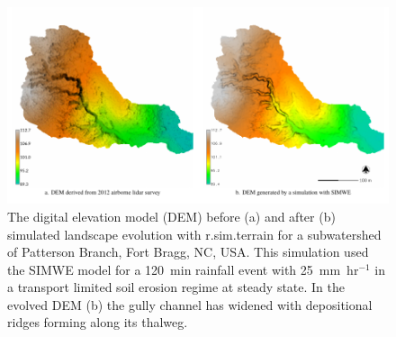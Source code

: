 \documentclass[gmd, manuscript]{copernicus}
\begin{document}


\begin{figure}%
\center
\includegraphics[width=\textwidth,height=0.925\textheight,keepaspectratio]{figures/evolution.pdf}
\caption{
The digital elevation model (DEM) 
before (a) and after (b)
simulated landscape evolution with r.sim.terrain 
for a subwatershed of Patterson Branch, Fort Bragg, NC, USA. 
This simulation used the SIMWE model
for a 120~\unit{min} rainfall event with 25~\unit{mm~hr}$^{-1}$
in a transport limited soil erosion regime at steady state.
In the evolved DEM (b)
the gully channel has widened 
with depositional ridges forming along its thalweg.}
\label{fig:evolution}
\end{figure}

\end{document}
